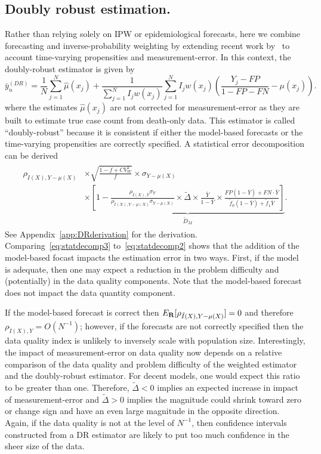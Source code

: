 \documentclass[11pt]{amsart}
\numberwithin{equation}{section}
\theoremstyle{plain}
\begin{document}
\subsection{Doubly robust estimation.}
Rather than relying solely on IPW or epidemiological forecasts, here we combine forecasting and inverse-probability weighting by extending recent work by~\cite{Chen2019} to account time-varying propensities and measurement-error. In this context, the doubly-robust estimator is given by
$$
\bar y_{n}^{(DR)} = \frac{1}{N} \sum_{j=1}^N \hat \mu (x_j) + \frac{1}{\sum_{j=1}^N I_j w (x_j)} \sum_{j=1}^N I_j w(x_j) \left( \frac{Y_j - FP}{1 - FP - FN} - \mu(x_j) \right).
$$
where the estimates $\hat \mu(x_j)$ are not corrected for measurement-error as they are built to estimate true case count from death-only data. This estimator is called ``doubly-robust'' because it is consistent if either the model-based forecasts or the time-varying propensities are correctly specified. A statistical error decomposition can be derived
\begin{align}
\label{eq:statdecomp3}
\begin{split}
\rho_{\tilde I (X), Y-\mu(X)} &\times \sqrt{\frac{1-f+ CV^2_W}{f}} \times \sigma_{Y-\mu(X)}  \\
&\times \underbrace{\left[ 1 - \frac{\rho_{\tilde I(X),Y} \sigma_{Y}}{\rho_{\tilde I(X),Y-\mu(X)} \sigma_{Y-\mu(X)}} \times \tilde \Delta \times \frac{\bar Y}{1-\bar Y} \times \frac{FP(1-\bar Y) + FN \cdot \bar Y}{\tilde f_0 (1-\bar Y) + \tilde f_1 \bar Y} \right]}_{\tilde D_M}.
\end{split}
\end{align}
See Appendix~\ref{app:DRderivation} for the derivation. Comparing~\eqref{eq:statdecomp3} to~\eqref{eq:statdecomp2} shows that the addition of the model-based focast impacts the estimation error in two ways.  First, if the model is adequate, then one may expect a reduction in the problem difficulty and (potentially) in the data quality components. Note that the model-based forecast does not impact the data quantity component.

If the model-based forecast is correct then $E_{\bf R} [ \rho_{\tilde I (X), Y-\mu(X)} ] = 0$  and therefore $\rho_{\tilde I(X), Y} = O(N^{-1})$; however, if the forecasts are not correctly specified then the data quality index is unlikely to inversely scale with population size. Interestingly, the impact of measurement-error on data quality now depends on a relative comparison of the data quality and problem difficulty of the weighted estimator and the doubly-robust estimator.  For decent models, one would expect this ratio to be greater than one.  Therefore, $\tilde \Delta < 0$ implies an expected increase in impact of measurement-error and $\tilde \Delta > 0$ implies the magnitude could shrink toward zero or change sign and have an even large magnitude in the opposite direction.  Again, if the data quality is not at the level of $N^{-1}$, then confidence intervals constructed from a DR estimator are likely to put too much confidence in the sheer size of the data.
\end{document}
